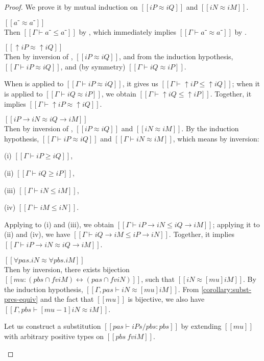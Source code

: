 \begin{proof}
  We prove it by mutual induction on $[[iP ≈ iQ]]$ and $[[iN ≈ iM]]$.
  \begin{caseof}
    \item $[[a⁻ ≈ a⁻]]$\\
      Then $[[Γ ⊢ a⁻ ≤ a⁻]]$ by ,
      which immediately implies $[[Γ ⊢ a⁻ ≈ a⁻]]$ by .

    \item $[[↑iP ≈ ↑iQ]]$\\
      Then by inversion of ,
      $[[iP ≈ iQ]]$, and from the induction hypothesis, $[[Γ ⊢ iP ≈ iQ]]$,
      and (by symmetry) $[[Γ ⊢ iQ ≈ iP]]$.

      When  is applied to $[[Γ ⊢ iP ≈ iQ]]$,
      it gives us $[[Γ ⊢ ↑iP ≤ ↑iQ]]$; when it is applied to $[[Γ ⊢ iQ ≈ iP]]$,
      we obtain $[[Γ ⊢ ↑iQ ≤ ↑iP]]$. Together, it implies $[[Γ ⊢ ↑iP ≈ ↑iQ]]$.

    \item $[[iP → iN ≈ iQ → iM]]$\\
      Then by inversion of ,
      $[[iP ≈ iQ]]$ and $[[iN ≈ iM]]$. By the induction hypothesis,
      $[[Γ ⊢ iP ≈ iQ]]$ and $[[Γ ⊢ iN ≈ iM]]$, which means by inversion:
      \begin{enumerate*}
        \item[(i)] $[[Γ ⊢ iP ≥ iQ]]$,
        \item[(ii)] $[[Γ ⊢ iQ ≥ iP]]$,
        \item[(iii)] $[[Γ ⊢ iN ≤ iM]]$,
        \item[(iv)]  $[[Γ ⊢ iM ≤ iN]]$.
      \end{enumerate*}
      Applying  to (i) and (iii), we obtain
      $[[Γ ⊢ iP → iN ≤ iQ → iM]]$; applying it to (ii) and (iv), we have $[[Γ ⊢
      iQ → iM ≤ iP → iN]]$. Together, it implies $[[Γ ⊢ iP → iN ≈ iQ → iM]]$.
    \item $[[∀pas.iN ≈ ∀pbs.iM]]$\\
      Then by inversion, there exists bijection $[[mu : ({pbs} ∩ fv iM) ↔ ({pas}
      ∩ fv iN)]]$, such that $[[iN ≈ [mu] iM]]$. By the induction hypothesis,
      $[[Γ, pas ⊢ iN ≈ [mu] iM]]$. From \cref{corollary:subst-pres-equiv} and
      the fact that $[[mu]]$ is bijective, we also have
      $[[Γ, pbs ⊢ [mu-1]iN ≈ iM]]$.

      Let us construct a substitution $[[{pas} ⊢ iPs/pbs : {pbs}]]$ by
      extending $[[mu]]$ with arbitrary positive types on $[[{pbs} \ fv iM]]$.


\end{caseof}
\end{proof}
